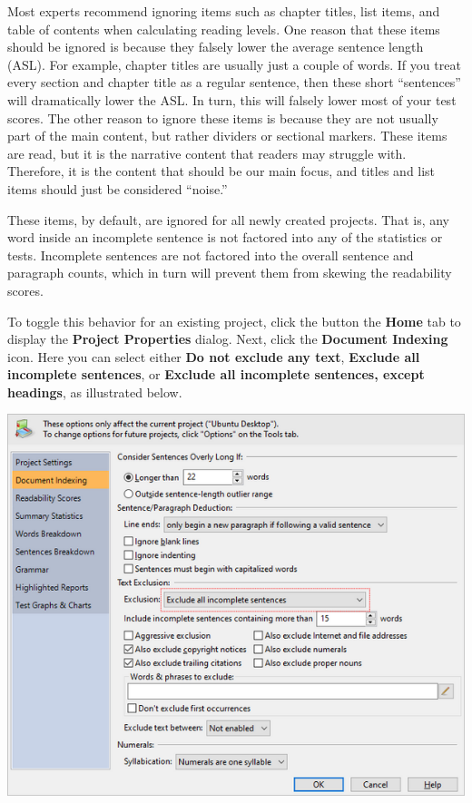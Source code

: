 \documentclass[
]{book}
\theoremstyle{definition}
\theoremstyle{definition}
\theoremstyle{definition}
\theoremstyle{definition}
\theoremstyle{remark}
\begin{document}
Most experts recommend ignoring items such as chapter titles, list items, and table of contents when calculating reading levels. One reason that these items should be ignored is because they falsely lower the average sentence length (ASL). For example, chapter titles are usually just a couple of words. If you treat every section and chapter title as a regular sentence, then these short ``sentences'' will dramatically lower the ASL. In turn, this will falsely lower most of your test scores. The other reason to ignore these items is because they are not usually part of the main content, but rather dividers or sectional markers. These items are read, but it is the narrative content that readers may struggle with. Therefore, it is the content that should be our main focus, and titles and list items should just be considered ``noise.''

These items, by default, are ignored for all newly created projects. That is, any word inside an incomplete sentence is not factored into any of the statistics or tests. Incomplete sentences are not factored into the overall sentence and paragraph counts, which in turn will prevent them from skewing the readability scores.

To toggle this behavior for an existing project, click the  button the \textbf{Home} tab to display the \textbf{Project Properties} dialog. Next, click the \textbf{Document Indexing} icon. Here you can select either \textbf{Do not exclude any text}, \textbf{Exclude all incomplete sentences}, or \textbf{Exclude all incomplete sentences, except headings}, as illustrated below.

\includegraphics{Images/excludeincompletesentences.png}
\end{document}
